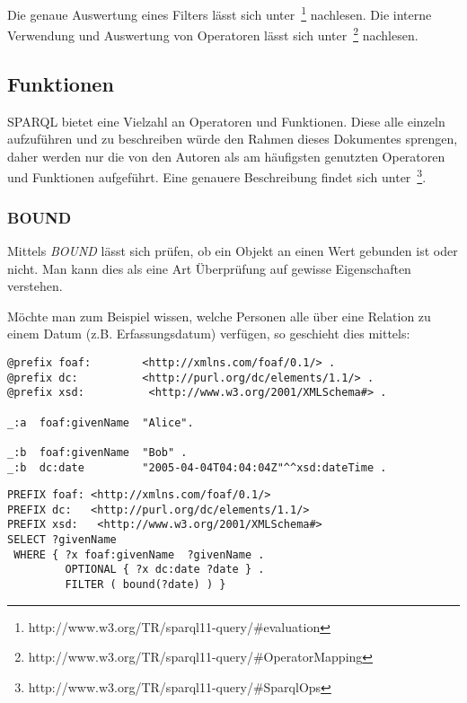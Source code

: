 Die genaue Auswertung eines Filters lässt sich unter~\footnote{http://www.w3.org/TR/sparql11-query/\#evaluation} nachlesen. Die interne Verwendung und Auswertung von Operatoren lässt sich unter~\footnote{http://www.w3.org/TR/sparql11-query/\#OperatorMapping} nachlesen.

\subsection{Funktionen}
\label{subsec:sparql_ausdruecke_funktionen}

SPARQL bietet eine Vielzahl an Operatoren und Funktionen. Diese alle einzeln aufzuführen und zu beschreiben würde den Rahmen dieses Dokumentes sprengen, daher werden nur die von den Autoren als am häufigsten genutzten Operatoren und Funktionen aufgeführt. Eine genauere Beschreibung findet sich unter~\footnote{http://www.w3.org/TR/sparql11-query/\#SparqlOps}.

\subsubsection{BOUND}
\label{subsec:sparql_ausdruecke_funktionen_bound}
Mittels \textit{BOUND} lässt sich prüfen, ob ein Objekt an einen Wert gebunden ist oder nicht. Man kann dies als eine Art Überprüfung auf gewisse Eigenschaften verstehen.

Möchte man zum Beispiel wissen, welche Personen alle über eine Relation zu einem Datum (z.B. Erfassungsdatum) verfügen, so geschieht dies mittels:

\begin{lstlisting}
@prefix foaf:        <http://xmlns.com/foaf/0.1/> .
@prefix dc:          <http://purl.org/dc/elements/1.1/> .
@prefix xsd:          <http://www.w3.org/2001/XMLSchema#> .

_:a  foaf:givenName  "Alice".

_:b  foaf:givenName  "Bob" .
_:b  dc:date         "2005-04-04T04:04:04Z"^^xsd:dateTime .
\end{lstlisting}

\begin{lstlisting}
PREFIX foaf: <http://xmlns.com/foaf/0.1/>
PREFIX dc:   <http://purl.org/dc/elements/1.1/>
PREFIX xsd:   <http://www.w3.org/2001/XMLSchema#>
SELECT ?givenName
 WHERE { ?x foaf:givenName  ?givenName .
         OPTIONAL { ?x dc:date ?date } .
         FILTER ( bound(?date) ) }
\end{lstlisting}

